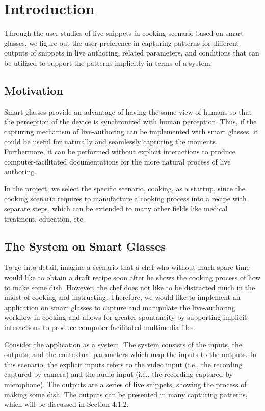 \documentclass[fyp]{socreport}
\begin{document}
\chapter{Introduction}
Through the user studies of live snippets in cooking scenario based on smart glasses, we figure out the user preference in capturing patterns for different outputs of snippets in live authoring, related parameters, and conditions that can be utilized to support the patterns implicitly in terms of a system.

\section{Motivation}
Smart glasses provide an advantage of having the same view of humans so that the perception of the device is synchronized with human perception. Thus, if the capturing mechanism of live-authoring can be implemented with smart glasses, it could be useful for naturally and seamlessly capturing the moments. Furthermore, it can be performed without explicit interactions to produce computer-facilitated documentations for the more natural process of live authoring.

In the project, we select the specific scenario, cooking, as a startup, since the cooking scenario requires to manufacture a cooking process into a recipe with separate steps, which can be extended to many other fields like medical treatment, education, etc. 

\section{The System on Smart Glasses}
To go into detail, imagine a scenario that a chef who without much spare time would like to obtain a draft recipe soon after he shows the cooking process of how to make some dish. However, the chef does not like to be distracted much in the midst of cooking and instructing. Therefore, we would like to implement an application on smart glasses to capture and manipulate the live-authoring workflow in cooking and allows for greater spontaneity by supporting implicit interactions to produce computer-facilitated multimedia files.

Consider the application as a system. The system consists of the inputs, the outputs, and the contextual parameters which map the inputs to the outputs. In this scenario, the explicit inputs refers to the video input (i.e., the recording captured by camera) and the audio input (i.e., the recording captured by microphone). The outputs are a series of live snippets, showing the process of making some dish. The outputs can be presented in many capturing patterns, which will be discussed in Section 4.1.2.
\end{document}
